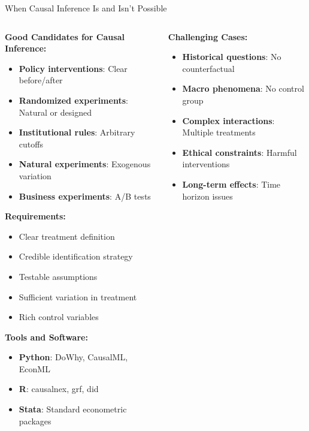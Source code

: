 \documentclass[aspectratio=169,11pt]{beamer}
\begin{document}
\begin{frame}{When Causal Inference Is and Isn't Possible}
\begin{columns}
\begin{column}{0.5\textwidth}
\textbf{Good Candidates for Causal Inference:}

\begin{itemize}
\item \textbf{Policy interventions}: Clear before/after
\item \textbf{Randomized experiments}: Natural or designed
\item \textbf{Institutional rules}: Arbitrary cutoffs
\item \textbf{Natural experiments}: Exogenous variation
\item \textbf{Business experiments}: A/B tests
\end{itemize}

\vspace{0.3cm}
\textbf{Requirements:}
\begin{itemize}
\item Clear treatment definition
\item Credible identification strategy
\item Testable assumptions
\item Sufficient variation in treatment
\item Rich control variables
\end{itemize}

\vspace{0.3cm}
\textbf{Tools and Software:}
\begin{itemize}
\item \textbf{Python}: DoWhy, CausalML, EconML
\item \textbf{R}: causalnex, grf, did
\item \textbf{Stata}: Standard econometric packages
\end{itemize}
\end{column}
\begin{column}{0.5\textwidth}
\textbf{Challenging Cases:}

\begin{itemize}
\item \textbf{Historical questions}: No counterfactual
\item \textbf{Macro phenomena}: No control group
\item \textbf{Complex interactions}: Multiple treatments
\item \textbf{Ethical constraints}: Harmful interventions
\item \textbf{Long-term effects}: Time horizon issues
\end{itemize}


\end{column}
\end{columns}
\end{frame}
\end{document}
